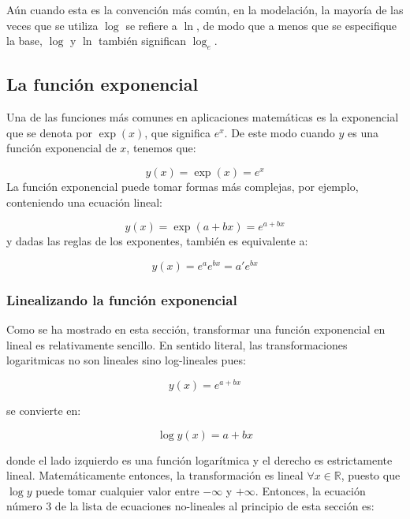 \documentclass[
]{book}
\begin{document}
Aún cuando esta es la convención más común, en la modelación, la mayoría de las veces que se utiliza \(\log\) se refiere a \(\ln\), de modo que a menos que se especifique la base, \(\log\) y \(\ln\) también significan \(\log_e\).

\hypertarget{la-funciuxf3n-exponencial}{%
\subsection{La función exponencial}\label{la-funciuxf3n-exponencial}}

Una de las funciones más comunes en aplicaciones matemáticas es la exponencial que se denota por \(\exp(x)\), que significa \(e^x\). De este modo cuando \(y\) es una función exponencial de \(x\), tenemos que:

\[y(x) = \exp(x) = e^x\]
La función exponencial puede tomar formas más complejas, por ejemplo, conteniendo una ecuación lineal:

\[y(x) = \exp(a + bx) = e^{a + bx}\]
y dadas las reglas de los exponentes, también es equivalente a:

\[y(x) = e^a e^{bx} = a' e^{bx}\]

\hypertarget{linealizando-la-funciuxf3n-exponencial}{%
\subsubsection{Linealizando la función exponencial}\label{linealizando-la-funciuxf3n-exponencial}}

Como se ha mostrado en esta sección, transformar una función exponencial en lineal es relativamente sencillo. En sentido literal, las transformaciones logaritmicas no son lineales sino log-lineales pues:

\begin{equation}
    y(x) = e^{a + bx} \label{eq:expon}
\end{equation}

se convierte en:

\begin{equation}
    \log y(x) = a + bx \label{eq:log-lin}
\end{equation}

donde el lado izquierdo es una función logarítmica y el derecho es estrictamente lineal. Matemáticamente entonces, la transformación es lineal \(\forall x \in \mathbb{R}\), puesto que \(\log y\) puede tomar cualquier valor entre \(-\infty\) y \(+\infty\). Entonces, la ecuación número 3 de la lista de ecuaciones no-lineales al principio de esta sección es:
\end{document}
